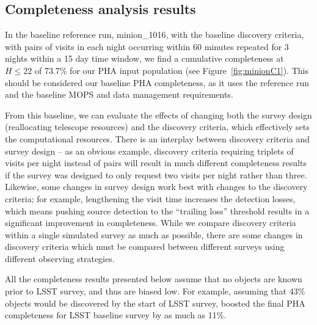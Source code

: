 \subsection{Completeness analysis results}

In the baseline reference run, minion\_1016, with the baseline discovery
criteria, with pairs of visits in each night occurring within 60 minutes
repeated for 3 nights within a 15 day time window, we find a cumulative
completeness at $H\le22$ of 73.7\% for our PHA input population (see
Figure~\ref{fig:minionC1}). This should be considered our baseline PHA
completeness, as it uses the reference run and the baseline MOPS and data
management requirements.

From this baseline, we can evaluate the effects of changing both the survey design (reallocating telescope resources) and the discovery criteria, which effectively sets the computational resources.
There is an interplay between discovery criteria and survey design -- as an obvious example, discovery criteria requiring triplets of visits per night instead of pairs will result in much different completeness results if the survey was designed to only request two visits per night rather than three. Likewise, some changes in survey design work best with changes to the discovery criteria; for example, lengthening the visit time increases the detection losses, which means pushing source detection to the ``trailing loss'' threshold results in a significant improvement in completeness. While we compare discovery criteria within a single simulated survey as much as possible, there are some changes in discovery criteria which must be compared between different surveys using different observing strategies.

All the completeness results presented below assume that no objects are known prior to LSST survey,
and thus are biased low. For example, assuming that 43\% objects would be discovered by the start of
LSST survey, \cite{GMS2016} boosted the final PHA completeness for LSST baseline survey by as much
as 11\%.


